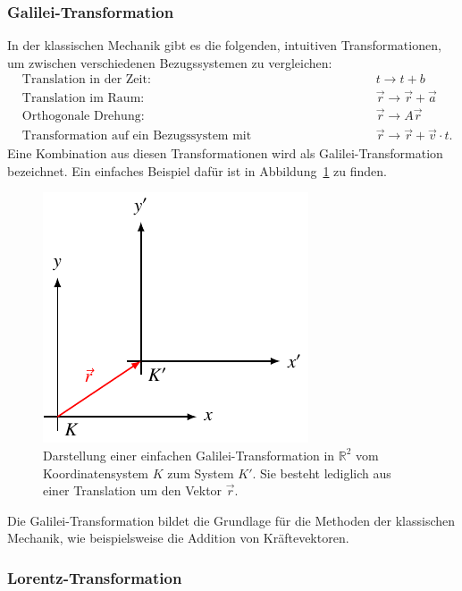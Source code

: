 \subsubsection{Galilei-Transformation 
\label{relativ:section:galilei-trafo}}

In der klassischen Mechanik gibt es die folgenden,
intuitiven Transformationen, um zwischen verschiedenen Bezugssystemen
zu vergleichen:
\[
\begin{aligned}
    &\text{Translation in der Zeit: } && t \rightarrow t + b \\
    &\text{Translation im Raum: } && \vec{r} \rightarrow \vec{r} + \vec{a} \\
    &\text{Orthogonale Drehung: } && \vec{r} \rightarrow A \vec{r} \\
    &\text{Transformation auf ein Bezugssystem mit Relativgeschwindigkeit: } && \vec{r} \rightarrow \vec{r} + \vec{v} \cdot t .
\end{aligned}
\]
Eine Kombination aus diesen Transformationen wird als Galilei-Transformation bezeichnet.
Ein einfaches Beispiel dafür ist in Abbildung~\ref{relativ:fig:galilei-trafo} zu finden.
\begin{figure}
    \centering
    \includegraphics{papers/relativ/tikz/galilei_trafo.pdf}
    \caption{Darstellung einer einfachen Galilei-Transformation in \(\mathbb{R}^2\)
    vom Koordinatensystem \(K\) zum System \(K'\).
    Sie besteht lediglich aus einer Translation um den Vektor \(\vec{r}\).
    \label{relativ:fig:galilei-trafo}}
\end{figure}
Die Galilei-Transformation bildet die Grundlage für die Methoden der klassischen Mechanik,
wie beispielsweise die Addition von Kräftevektoren.

\subsubsection{Lorentz-Transformation 
\label{relativ:section:lorentz-trafo}}

